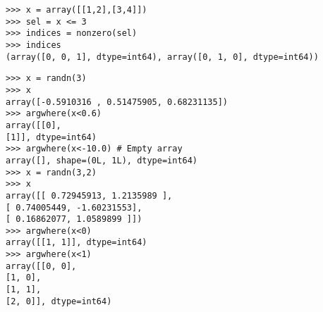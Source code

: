 \documentclass[KSmain.tex]{subfiles}
\begin{document}
\begin{framed}
\begin{verbatim}
>>> x = array([[1,2],[3,4]])
>>> sel = x <= 3
>>> indices = nonzero(sel)
>>> indices
(array([0, 0, 1], dtype=int64), array([0, 1, 0], dtype=int64))
\end{verbatim}
\end{framed}

\begin{framed}
\begin{verbatim}
>>> x = randn(3)
>>> x
array([-0.5910316 , 0.51475905, 0.68231135])
>>> argwhere(x<0.6)
array([[0],
[1]], dtype=int64)
>>> argwhere(x<-10.0) # Empty array
array([], shape=(0L, 1L), dtype=int64)
>>> x = randn(3,2)
>>> x
array([[ 0.72945913, 1.2135989 ],
[ 0.74005449, -1.60231553],
[ 0.16862077, 1.0589899 ]])
>>> argwhere(x<0)
array([[1, 1]], dtype=int64)
>>> argwhere(x<1)
array([[0, 0],
[1, 0],
[1, 1],
[2, 0]], dtype=int64)

\end{verbatim}
\end{framed}
\newpage
\end{document}
